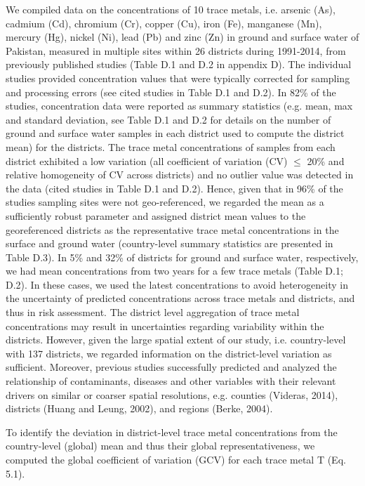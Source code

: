 We compiled data on the concentrations of 10 trace metals, i.e. arsenic (As), cadmium (Cd), chromium (Cr), copper (Cu), iron (Fe), manganese (Mn), mercury (Hg), nickel (Ni), lead (Pb) and zinc (Zn) in ground and surface water of Pakistan, measured in multiple sites within 26 districts during 1991-2014, from previously published studies (Table D.1 and D.2 in appendix D). The individual studies provided concentration values that were typically corrected for sampling and processing errors (see cited studies in Table D.1 and D.2). In 82\% of the studies, concentration data were reported as summary statistics (e.g. mean, max and standard deviation, see Table D.1 and D.2 for details on the number of ground and surface water samples in each district used to compute the district mean) for the districts. The trace metal concentrations of samples from each district exhibited a low variation (all coefficient of variation (CV) $\leq$ 20\% and relative homogeneity of CV across districts) and no outlier value was detected in the data (cited studies in Table D.1 and D.2). Hence, given that in 96\% of the studies sampling sites were not geo-referenced, we regarded the mean as a sufficiently robust parameter and assigned district mean values to the georeferenced districts as the representative trace metal concentrations in the surface and ground water (country-level summary statistics are presented in Table D.3). In 5\% and 32\% of districts for ground and surface water, respectively, we had mean concentrations from two years for a few trace metals (Table D.1; D.2). In these cases, we used the latest concentrations to avoid heterogeneity in the uncertainty of predicted concentrations across trace metals and districts, and thus in risk assessment. The district level aggregation of trace metal concentrations may result in uncertainties regarding variability within the districts. However, given the large spatial extent of our study, i.e. country-level with 137 districts, we regarded information on the district-level variation as sufficient. Moreover, previous studies successfully predicted and analyzed the relationship of contaminants, diseases and other variables with their relevant drivers on similar or coarser spatial resolutions, e.g. counties (Videras, 2014), districts (Huang and Leung, 2002), and regions (Berke, 2004).

To identify the deviation in district-level trace metal concentrations from the country-level (global) mean and thus their global representativeness, we computed the global coefficient of variation (GCV) for each trace metal T (Eq. 5.1).

